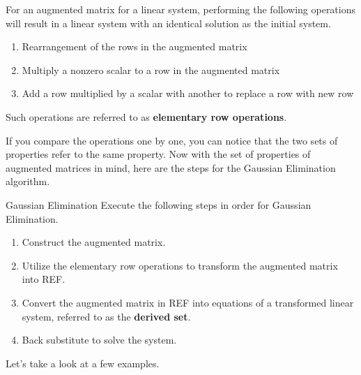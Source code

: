 \documentclass[../main.tex]{subfiles}
\begin{document}
\begin{definition}
For an augmented matrix for a linear system, performing the following
operations will result in a linear system with an identical solution
as the initial system.
\begin{enumerate}[noitemsep]
\item[$R_1$.]
Rearrangement of the rows in the augmented matrix
\item[$R_2$.]
Multiply a nonzero scalar to a row in the augmented matrix
\item[$R_3$.]
Add a row multiplied by a scalar with another to replace a row with
new row
\end{enumerate}
Such operations are referred to as \textbf{elementary row operations}.
\end{definition}

If you compare the operations one by one, you can notice that the
two sets of properties refer to the same property. Now with the
set of properties of augmented matrices in mind, here are the steps
for the Gaussian Elimination algorithm.

\begin{theorem}{Gaussian Elimination}
Execute the following steps in order for Gaussian Elimination.
\begin{enumerate}[noitemsep]
\item
Construct the augmented matrix.
\item
Utilize the elementary row operations to transform the augmented
matrix into REF.
\item
Convert the augmented matrix in REF into equations of a transformed
linear system, referred to as the \textbf{derived set}.
\item
Back substitute to solve the system.
\end{enumerate}
\end{theorem}

Let's take a look at a few examples.
\end{document}

